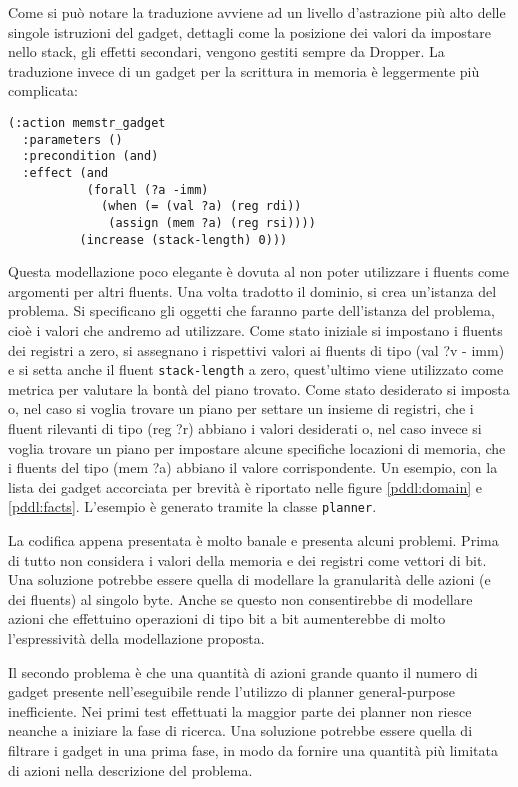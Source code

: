 Come si può notare la traduzione avviene ad un livello d'astrazione
più alto delle singole istruzioni del gadget, dettagli come la
posizione dei valori da impostare nello stack, gli effetti secondari,
vengono gestiti sempre da Dropper. La traduzione invece di un gadget
per la scrittura in memoria è leggermente più complicata:

\begin{lstlisting}
(:action memstr_gadget
  :parameters ()
  :precondition (and)
  :effect (and 
           (forall (?a -imm) 
             (when (= (val ?a) (reg rdi))
              (assign (mem ?a) (reg rsi))))
          (increase (stack-length) 0)))
\end{lstlisting}

Questa modellazione poco elegante è dovuta al non poter utilizzare i
fluents come argomenti per altri fluents.  Una volta tradotto il
dominio, si crea un'istanza del problema. Si specificano gli oggetti
che faranno parte dell'istanza del problema, cioè i valori che andremo
ad utilizzare. Come stato iniziale si impostano i fluents dei registri
a zero, si assegnano i rispettivi valori ai fluents di tipo (val ?v -
imm) e si setta anche il fluent \lstinline{stack-length} a zero,
quest'ultimo viene utilizzato come metrica per valutare la bontà del
piano trovato. Come stato desiderato si imposta o, nel caso si voglia
trovare un piano per settare un insieme di registri, che i fluent
rilevanti di tipo (reg ?r) abbiano i valori desiderati o, nel caso
invece si voglia trovare un piano per impostare alcune specifiche
locazioni di memoria, che i fluents del tipo (mem ?a) abbiano il
valore corrispondente. Un esempio, con la lista dei gadget accorciata
per brevità è riportato nelle figure \ref{pddl:domain} e
\ref{pddl:facts}. L'esempio è generato tramite la classe
\lstinline{planner}.

La codifica appena presentata è molto banale e presenta alcuni
problemi. Prima di tutto non considera i valori della memoria e dei
registri come vettori di bit. Una soluzione potrebbe essere quella di
modellare la granularità delle azioni (e dei fluents) al singolo
byte. Anche se questo non consentirebbe di modellare azioni che
effettuino operazioni di tipo bit a bit aumenterebbe di molto
l'espressività della modellazione proposta. 

Il secondo problema è che una quantità di azioni grande quanto il
numero di gadget presente nell'eseguibile rende l'utilizzo di planner
general-purpose inefficiente. Nei primi test effettuati la maggior
parte dei planner non riesce neanche a iniziare la fase di
ricerca. Una soluzione potrebbe essere quella di filtrare i gadget in
una prima fase, in modo da fornire una quantità più limitata di azioni
nella descrizione del problema.


